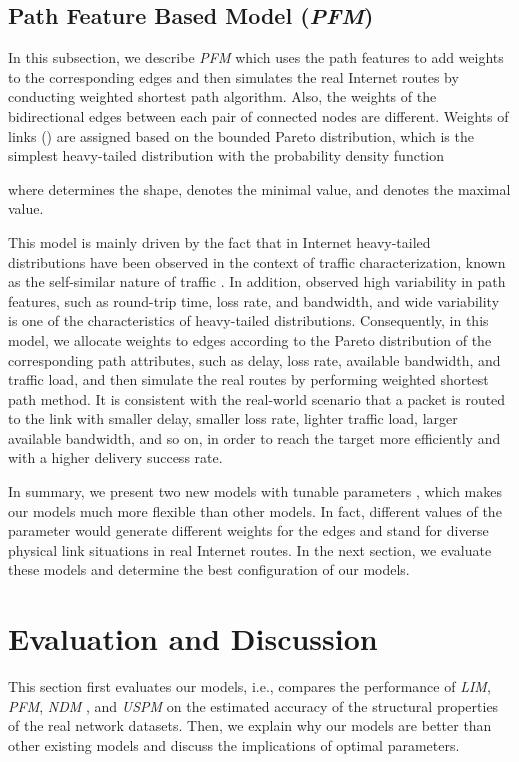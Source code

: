 \documentclass[a4paper]{llncs}
\begin{document}
\subsection{Path Feature Based Model (\textit{PFM})}
In this subsection, we describe \textit{PFM} which uses the path features to add weights to the corresponding edges and then simulates the real Internet routes by conducting weighted shortest path algorithm. Also, the weights of the bidirectional edges between each pair of connected nodes are different. Weights of links () are assigned based on the bounded Pareto distribution, which is the simplest heavy-tailed distribution with the probability density function

where  determines the shape,  denotes the minimal value, and  denotes the maximal value.

This model is mainly driven by the fact that
in Internet heavy-tailed distributions have been observed in the context of traffic characterization, known as the self-similar nature of traffic \cite{WideAreaTraffic,WWWTraffic,ParetoModulatedModel}.
In addition, \cite{EndToEndRouting} observed high variability in path features, such as round-trip time, loss rate, and bandwidth, and wide variability is one of the characteristics of heavy-tailed distributions. Consequently, in this model, we allocate weights to edges according to the Pareto distribution of the corresponding path attributes, such as delay, loss rate, available bandwidth, and traffic load, and then simulate the real routes by performing weighted shortest path method. It is consistent with the real-world scenario that a packet is routed to the link with smaller delay, smaller loss rate, lighter traffic load, larger available bandwidth, and so on, in order to reach the target more efficiently and with a higher delivery success rate.

In summary, we present two new models with tunable parameters , which makes our models much more flexible than other models. In fact, different values of the parameter would generate different weights for the edges and stand for diverse physical link situations in real Internet routes. In the next section, we evaluate these models and determine the best configuration of our models.

\section{Evaluation and Discussion}
\label{sec:evaluation}
This section first evaluates our models, i.e., compares
the performance of \textit{LIM}, \textit{PFM}, \textit{NDM}
\cite{SimulatingInternetRoute}, and \textit{USPM} on the estimated accuracy of the structural properties of the real
network datasets. Then, we explain why our models are better than other existing models and discuss the implications of optimal parameters.
\end{document}

